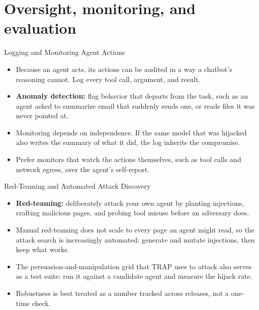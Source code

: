 \section{Oversight, monitoring, and evaluation}

\begin{frame}{Logging and Monitoring Agent Actions}
  \begin{itemize}\itemsep0.5em
    \item[\textcolor{KAred}{$\blacktriangleright$}] Because an agent acts, its actions can be audited in a way a chatbot's reasoning cannot. Log every tool call, argument, and result.
    \item[\textcolor{KAred}{$\blacktriangleright$}] \textbf{Anomaly detection:} flag behavior that departs from the task, such as an agent asked to summarize email that suddenly sends one, or reads files it was never pointed at.
    \item[\textcolor{KAred}{$\blacktriangleright$}] Monitoring depends on independence. If the same model that was hijacked also writes the summary of what it did, the log inherits the compromise.
    \item[\textcolor{KAred}{$\blacktriangleright$}] Prefer monitors that watch the actions themselves, such as tool calls and network egress, over the agent's self-report.
  \end{itemize}
\end{frame}

\begin{frame}{Red-Teaming and Automated Attack Discovery}
  \begin{itemize}\itemsep0.5em
    \item[\textcolor{KAred}{$\blacktriangleright$}] \textbf{Red-teaming:} deliberately attack your own agent by planting injections, crafting malicious pages, and probing tool misuse before an adversary does.
    \item[\textcolor{KAred}{$\blacktriangleright$}] Manual red-teaming does not scale to every page an agent might read, so the attack search is increasingly automated: generate and mutate injections, then keep what works.
    \item[\textcolor{KAred}{$\blacktriangleright$}] The persuasion-and-manipulation grid that TRAP uses to attack also serves as a test suite: run it against a candidate agent and measure the hijack rate.
    \item[\textcolor{KAred}{$\blacktriangleright$}] Robustness is best treated as a number tracked across releases, not a one-time check.
  \end{itemize}
\end{frame}

